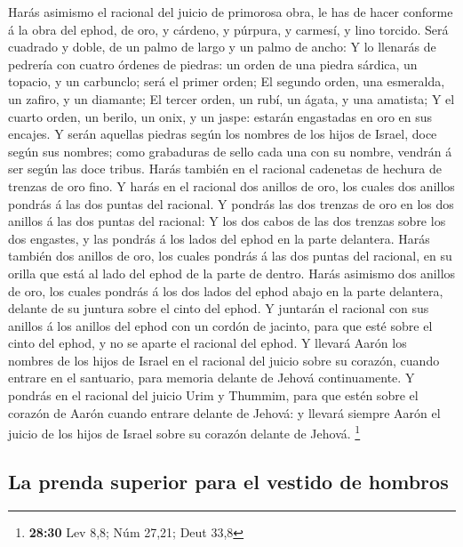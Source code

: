  Harás asimismo el racional del juicio de primorosa obra,
le has de hacer conforme á la obra del ephod, de oro, y cárdeno, y
púrpura, y carmesí, y lino torcido.  Será cuadrado y
doble, de un palmo de largo y un palmo de ancho:  Y lo
llenarás de pedrería con cuatro órdenes de piedras: un orden de una
piedra sárdica, un topacio, y un carbunclo; será el primer orden;
 El segundo orden, una esmeralda, un zafiro, y un
diamante;  El tercer orden, un rubí, un ágata, y una
amatista;  Y el cuarto orden, un berilo, un onix, y un
jaspe: estarán engastadas en oro en sus encajes.  Y serán
aquellas piedras según los nombres de los hijos de Israel, doce según
sus nombres; como grabaduras de sello cada una con su nombre, vendrán á
ser según las doce tribus.  Harás también en el racional
cadenetas de hechura de trenzas de oro fino.  Y harás en
el racional dos anillos de oro, los cuales dos anillos pondrás á las dos
puntas del racional.  Y pondrás las dos trenzas de oro en
los dos anillos á las dos puntas del racional:  Y los dos
cabos de las dos trenzas sobre los dos engastes, y las pondrás á los
lados del ephod en la parte delantera.  Harás también dos
anillos de oro, los cuales pondrás á las dos puntas del racional, en su
orilla que está al lado del ephod de la parte de dentro. 
Harás asimismo dos anillos de oro, los cuales pondrás á los dos lados
del ephod abajo en la parte delantera, delante de su juntura sobre el
cinto del ephod.  Y juntarán el racional con sus anillos
á los anillos del ephod con un cordón de jacinto, para que esté sobre el
cinto del ephod, y no se aparte el racional del ephod.  Y
llevará Aarón los nombres de los hijos de Israel en el racional del
juicio sobre su corazón, cuando entrare en el santuario, para memoria
delante de Jehová continuamente.  Y pondrás en el
racional del juicio Urim y Thummim, para que estén sobre el corazón de
Aarón cuando entrare delante de Jehová: y llevará siempre Aarón el
juicio de los hijos de Israel sobre su corazón delante de Jehová.
\footnote{\textbf{28:30} Lev 8,8; Núm 27,21; Deut 33,8}

\hypertarget{la-prenda-superior-para-el-vestido-de-hombros}{%
\subsection{La prenda superior para el vestido de
hombros}\label{la-prenda-superior-para-el-vestido-de-hombros}}

